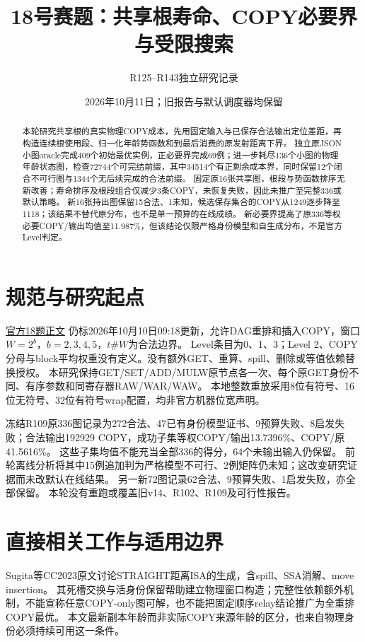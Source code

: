 \documentclass[UTF8,11pt,a4paper]{ctexart}
\title{18号赛题：共享根寿命、COPY必要界与受限搜索}
\author{R125--R143独立研究记录}
\date{2026年10月11日；旧报告与默认调度器均保留}
\begin{document}
\maketitle
\begin{abstract}
本轮研究共享根的真实物理COPY成本，先用固定输入与已保存合法输出定位差距，再构造连续根使用段、归一化年龄势函数和到最后消费的原发射距离下界。
独立原JSON小图oracle完成409个初始最优实例，正必要界完成69例；进一步耗尽136个小图的物理年龄状态图，检查72744个可完结前缀，其中34514个有正剩余成本界，同时保留12个闭合不可行图与1344个无后续完成的合法前缀。
固定原16张共享图，根段与势函数排序无新改善；寿命排序及根段组合仅减少3条COPY，未恢复失败，因此未推广至完整336或默认策略。
新16张持出图保留15合法、1未知，候选保存集合的COPY从1249逐步降至1118；该结果不替代原分布，也不是单一预算的在线成绩。
新必要界提高了原336等权必要COPY/输出均值至11.987\%，但该结论仅限严格身份模型和自生成分布，不是官方Level判定。
\end{abstract}

\section{规范与研究起点}
\href{https://www.chaspark.com/\#/races/competitions/1326690549003280384}{官方18题正文}
仍标2026年10月10日09:18更新，允许DAG重排和插入COPY，窗口$W=2^b$，$b=2,3,4,5$，$t\#W$为合法边界。
Level条目为0、1、3；Level 2、COPY分母与block平均权重没有定义。没有额外GET、重算、spill、删除或等值依赖替换授权。
本研究保持GET/SET/ADD/MULW原节点各一次、每个原GET身份不同、有序参数和同寄存器RAW/WAR/WAW。
本地整数重放采用8位有符号、16位无符号、32位有符号wrap配置，均非官方机器位宽声明。

冻结R109原336图记录为272合法、47已有身份模型证书、9预算失败、8启发失败；合法输出192929 COPY，成功子集等权COPY/输出13.7396\%、COPY/原41.5616\%。
这些子集均值不能充当全部336的得分，64个未输出输入仍保留。
前轮离线分析将其中15例追加判为严格模型不可行、2例矩阵仍未知；这改变研究证据而未改默认在线结果。
另一新72图记录62合法、9预算失败、1启发失败，亦全部保留。
本轮没有重跑或覆盖旧v14、R102、R109及可行性报告。

\section{直接相关工作与适用边界}
Sugita等CC2023原文\cite{sugita}讨论STRAIGHT距离ISA的生成，含spill、SSA消解、move insertion。
其死槽交换与活身份保留帮助建立物理窗口构造；完整性依赖额外机制，不能宣称任意COPY-only图可解，也不能把固定顺序relay结论推广为全重排COPY最优。
本文最新副本年龄而非实际COPY来源年龄的区分，也来自物理身份必须持续可用这一条件。
\end{document}
